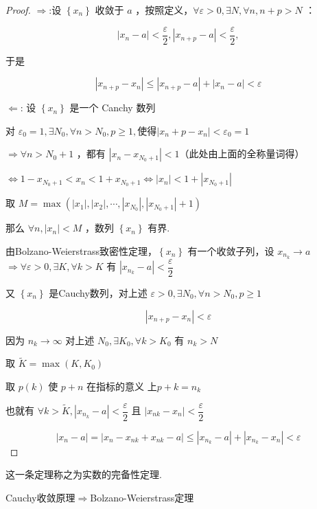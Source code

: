 \begin{proof}
	$\Rightarrow$:设 $\left\{x_n\right\}$ 收敛于 $a$ ，按照定义，$\forall \varepsilon>0, \exists N, \forall n, n+p>N$ ：
	
	$$
	\left|x_n-a\right|<\dfrac{\varepsilon}{2},\left|x_{n+p}-a\right|<\dfrac{\varepsilon}{2},
	$$
	
	
	于是
	
	$$
	\left|x_{n+p}-x_n\right| \leqslant\left|x_{n+p}-a\right|+\left|x_n-a\right|<\varepsilon
	$$
	
	$\Leftarrow$: 设 $\left\{x_n\right\}$ 是一个 Canchy 数列
	
	对 $\varepsilon_0=1 ,\exists N_0 , \forall n>N_0 , p \geqslant 1 ,\text{使得}\left|x_n+p-x_n\right|<\varepsilon_0=1$
	
	$\Rightarrow \forall n>N_0+1$ ，都有 $\left|x_n-x_{N_0+1}\right|<1$（此处由上面的全称量词得）
	
	$\Leftrightarrow 1-x_{N_0+1}<x_n<1+x_{N_0+1} \Leftrightarrow\left|x_n\right|<1+\left|x_{N_0+1}\right|$
	
	取 $M=\max \left(\left|x_1\right|,\left|x_2\right|, \cdots,\left|x_{N_0}\right|,\left|x_{N_0+1}\right|+1\right)$
	
	那么 $\forall n ,\left|x_n\right|<M$ ，数列 $\left\{x_n\right\}$ 有界.
	
	由Bolzano-Weierstrass致密性定理，$\left\{x_n\right\}$ 有一个收敛子列，设 $x_{n_k} \rightarrow a$
	$\Rightarrow \forall \varepsilon>0, \exists K , \forall k>K$ 有 $\left|x_{n_k}-a\right|<\dfrac{\varepsilon}{2}  $
	
	又 $\left\{x_n\right\}$ 是Cauchy数列，对上述 $\varepsilon>0 ,\exists N_0, \forall n>N_0,p \geqslant 1$
	
	$$
	\left|x_{n+p}-x_n\right|<\varepsilon
	$$
	
	
	因为 $n_k \rightarrow \infty$ 对上述 $N_0 ,\exists K_0 , \forall k>K_0$ 有 $n_k>N$ 
	
	取 $\widetilde{K}=\max \left(K, K_0\right)$
	
	取 $p(k)$ 使 $p+n$ 在指标的意义 上$p+k=n_k$
	
	也就有 $\forall k>\widetilde{K} ,\left|x_{n_k}-a\right|<\dfrac{\varepsilon}{2}  $ 且 $\left|x_{n k}-x_n\right|<\dfrac{\varepsilon}{2}$
	
	$$
	\left|x_n-a\right|=\left|x_n-x_{n k}+x_{n k}-a\right| \leqslant\left|x_{n_k}-a\right|+\left|x_{n_k}-x_n\right|<\varepsilon
	$$
\end{proof}
这一条定理称之为实数的完备性定理.
\begin{proposition}
	Cauchy收敛原理$\Rightarrow$Bolzano-Weierstrass定理
\end{proposition}
